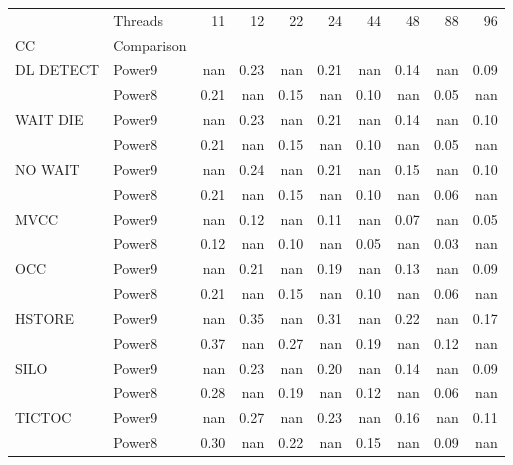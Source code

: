 \begin{tabular}{llrrrrrrrr}
\toprule
       & Threads &   11 &   12 &   22 &   24 &   44 &   48 &   88 &   96 \\
CC & Comparison &      &      &      &      &      &      &      &      \\
\midrule
DL DETECT & Power9 &  nan & 0.23 &  nan & 0.21 &  nan & 0.14 &  nan & 0.09 \\
       & Power8 & 0.21 &  nan & 0.15 &  nan & 0.10 &  nan & 0.05 &  nan \\
WAIT DIE & Power9 &  nan & 0.23 &  nan & 0.21 &  nan & 0.14 &  nan & 0.10 \\
       & Power8 & 0.21 &  nan & 0.15 &  nan & 0.10 &  nan & 0.05 &  nan \\
NO WAIT & Power9 &  nan & 0.24 &  nan & 0.21 &  nan & 0.15 &  nan & 0.10 \\
       & Power8 & 0.21 &  nan & 0.15 &  nan & 0.10 &  nan & 0.06 &  nan \\
MVCC & Power9 &  nan & 0.12 &  nan & 0.11 &  nan & 0.07 &  nan & 0.05 \\
       & Power8 & 0.12 &  nan & 0.10 &  nan & 0.05 &  nan & 0.03 &  nan \\
OCC & Power9 &  nan & 0.21 &  nan & 0.19 &  nan & 0.13 &  nan & 0.09 \\
       & Power8 & 0.21 &  nan & 0.15 &  nan & 0.10 &  nan & 0.06 &  nan \\
HSTORE & Power9 &  nan & 0.35 &  nan & 0.31 &  nan & 0.22 &  nan & 0.17 \\
       & Power8 & 0.37 &  nan & 0.27 &  nan & 0.19 &  nan & 0.12 &  nan \\
SILO & Power9 &  nan & 0.23 &  nan & 0.20 &  nan & 0.14 &  nan & 0.09 \\
       & Power8 & 0.28 &  nan & 0.19 &  nan & 0.12 &  nan & 0.06 &  nan \\
TICTOC & Power9 &  nan & 0.27 &  nan & 0.23 &  nan & 0.16 &  nan & 0.11 \\
       & Power8 & 0.30 &  nan & 0.22 &  nan & 0.15 &  nan & 0.09 &  nan \\
\bottomrule
\end{tabular}
